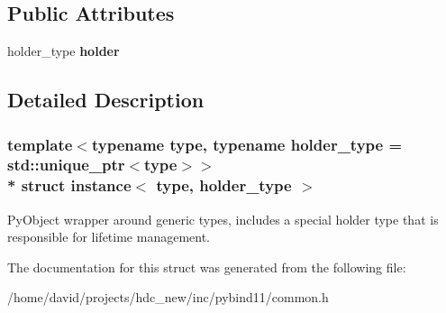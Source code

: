 \subsection*{Public Attributes}
\begin{DoxyCompactItemize}
\item 
holder\+\_\+type {\bfseries holder}\hypertarget{structinstance_abba3bf3e04629ca81f04b6dd68acb577}{}\label{structinstance_abba3bf3e04629ca81f04b6dd68acb577}

\end{DoxyCompactItemize}


\subsection{Detailed Description}
\subsubsection*{template$<$typename type, typename holder\+\_\+type = std\+::unique\+\_\+ptr$<$type$>$$>$\\*
struct instance$<$ type, holder\+\_\+type $>$}

Py\+Object wrapper around generic types, includes a special holder type that is responsible for lifetime management. 

The documentation for this struct was generated from the following file\+:\begin{DoxyCompactItemize}
\item 
/home/david/projects/hdc\+\_\+new/inc/pybind11/common.\+h\end{DoxyCompactItemize}
